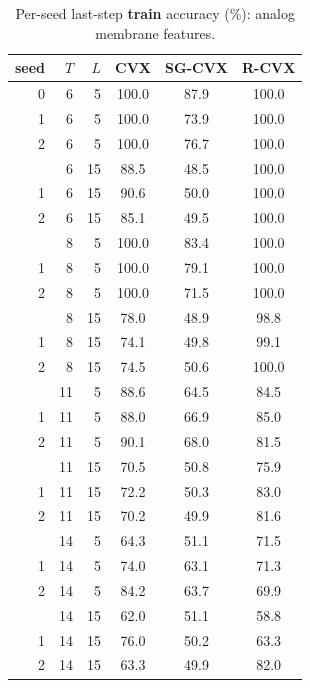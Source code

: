 \documentclass[11pt]{article}
\begin{document}
\begin{table}[p]
\centering
\caption{Per-seed last-step \textbf{train} accuracy (\%): analog membrane features.}
\label{tab:xor-train-perseed-analog}
\begin{tabular}{rrrccc}
\toprule
seed & $T$ & $L$ & CVX & SG-CVX & R-CVX \\
\midrule
0 & 6 & 5 & 100.0 & 87.9 & 100.0 \\
1 & 6 & 5 & 100.0 & 73.9 & 100.0 \\
2 & 6 & 5 & 100.0 & 76.7 & 100.0 \\
\addlinespace
0 & 6 & 15 & 88.5 & 48.5 & 100.0 \\
1 & 6 & 15 & 90.6 & 50.0 & 100.0 \\
2 & 6 & 15 & 85.1 & 49.5 & 100.0 \\
\addlinespace
0 & 8 & 5 & 100.0 & 83.4 & 100.0 \\
1 & 8 & 5 & 100.0 & 79.1 & 100.0 \\
2 & 8 & 5 & 100.0 & 71.5 & 100.0 \\
\addlinespace
0 & 8 & 15 & 78.0 & 48.9 & 98.8 \\
1 & 8 & 15 & 74.1 & 49.8 & 99.1 \\
2 & 8 & 15 & 74.5 & 50.6 & 100.0 \\
\addlinespace
0 & 11 & 5 & 88.6 & 64.5 & 84.5 \\
1 & 11 & 5 & 88.0 & 66.9 & 85.0 \\
2 & 11 & 5 & 90.1 & 68.0 & 81.5 \\
\addlinespace
0 & 11 & 15 & 70.5 & 50.8 & 75.9 \\
1 & 11 & 15 & 72.2 & 50.3 & 83.0 \\
2 & 11 & 15 & 70.2 & 49.9 & 81.6 \\
\addlinespace
0 & 14 & 5 & 64.3 & 51.1 & 71.5 \\
1 & 14 & 5 & 74.0 & 63.1 & 71.3 \\
2 & 14 & 5 & 84.2 & 63.7 & 69.9 \\
\addlinespace
0 & 14 & 15 & 62.0 & 51.1 & 58.8 \\
1 & 14 & 15 & 76.0 & 50.2 & 63.3 \\
2 & 14 & 15 & 63.3 & 49.9 & 82.0 \\
\bottomrule
\end{tabular}
\end{table}
\end{document}
